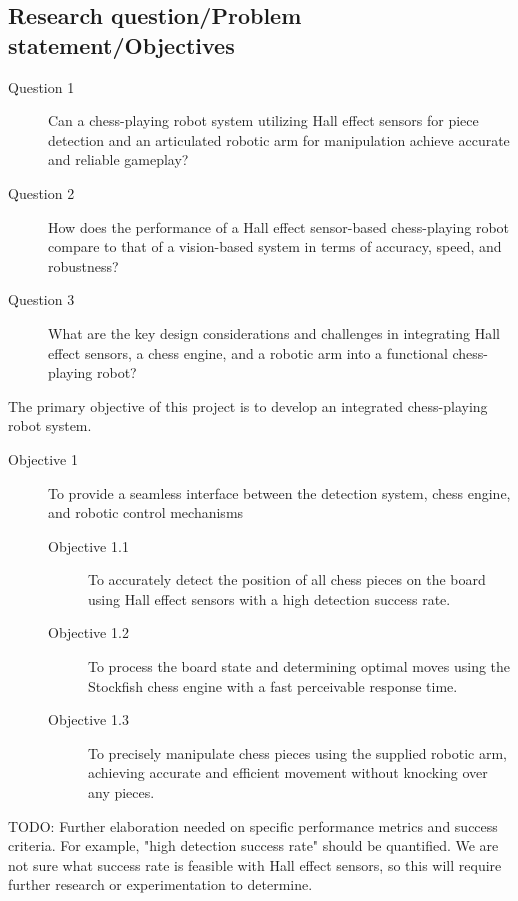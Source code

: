 \subsection{Research question/Problem statement/Objectives}
\label{sec:research-question}

\begin{description}
  \item[Question 1] Can a chess-playing robot system utilizing Hall effect sensors for piece detection and an articulated robotic arm for manipulation achieve accurate and reliable gameplay?
  \item[Question 2] How does the performance of a Hall effect sensor-based chess-playing robot compare to that of a vision-based system in terms of accuracy, speed, and robustness?
  \item[Question 3] What are the key design considerations and challenges in integrating Hall effect sensors, a chess engine, and a robotic arm into a functional chess-playing robot?
\end{description}

The primary objective of this project is to develop an integrated chess-playing robot system.
\begin{description}
  \item[Objective 1] To provide a seamless interface between the detection system, chess engine, and robotic control mechanisms
        \begin{description}
          \item[Objective 1.1] To accurately detect the position of all chess pieces on the board using Hall effect sensors with a high detection success rate.
          \item[Objective 1.2] To process the board state and determining optimal moves using the Stockfish chess engine with a fast perceivable response time.
          \item[Objective 1.3] To precisely manipulate chess pieces using the supplied robotic arm, achieving accurate and efficient movement without knocking over any pieces.
        \end{description}
\end{description}

TODO: Further elaboration needed on specific performance metrics and success criteria. For example, "high detection success rate" should be quantified. We are not sure what success rate is feasible with Hall effect sensors, so this will require further research or experimentation to determine.

